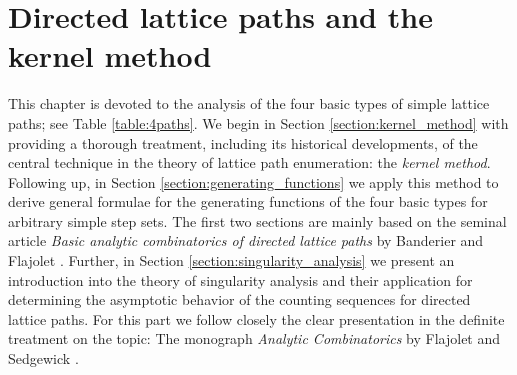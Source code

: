 \chapter{Directed lattice paths and the kernel method}
\label{chapter:directed_lattice_paths_kernel_method}

This chapter is devoted to the analysis of the four basic types of simple lattice paths; see Table \ref{table:4paths}.
We begin in Section \ref{section:kernel_method} with providing a thorough treatment, including its historical developments, of the central technique in the theory of lattice path enumeration: the \textit{kernel method}. 
Following up, in Section \ref{section:generating_functions} we apply this method to derive general formulae for the generating functions of the four basic types for arbitrary simple step sets. 
The first two sections are mainly based on the seminal article
\textit{Basic analytic combinatorics of directed lattice paths} by Banderier and Flajolet \cite{Basic}.
Further, in Section \ref{section:singularity_analysis} we present an introduction into the theory of singularity analysis and their application for determining the asymptotic behavior of the counting sequences for directed lattice paths. 
For this part we follow closely the clear presentation in the definite treatment on the topic: 
The monograph \textit{Analytic Combinatorics} by Flajolet and Sedgewick \cite{AnalyticCombinatorics}.

